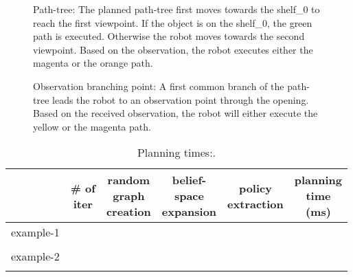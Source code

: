 \documentclass[letterpaper, 10 pt, conference]{ieeeconf}  %
\begin{document}
\begin{figure}[!htb]
 \caption{Path-tree: The planned path-tree first moves towards the shelf\_0 to reach the first viewpoint. If the object is on the shelf\_0, the green path is executed. Otherwise the robot moves towards the second viewpoint. Based on the observation, the robot executes either the magenta or the orange path.}
 \label{fig:example_1_path_tree}
\end{figure}

\begin{figure}[!htb]
 \caption{Observation branching point: A first common branch of the path-tree leads the robot to an observation point through the opening. Based on the received observation, the robot will either execute the yellow or the magenta path.}
 \label{fig:example_2_view_point}
\end{figure}






\begin{table}[h]
\begin{center}
\begin{tabular}{|c||c|c|c|c||c|}
\hline
  & \thead{\# of\\ iter} & \thead{random\\graph\\creation} & \thead{belief-\\space\\expansion} & \thead{policy\\ extraction} & \thead{planning\\time\\(ms)} \\
\hline
example-1  & & & & &\\
 & & & & &\\
\hline
example-2  & & & & &\\
 & & & & &\\
\hline
\end{tabular}
\end{center}
\caption{Planning times:.}
\label{tab:planning_times}
\end{table}
\end{document}
